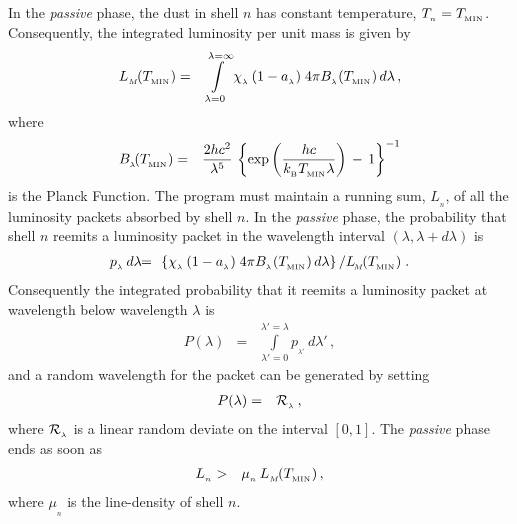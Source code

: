 \documentclass[usenatbib]{mn2e}
\numberwithin{equation}{section}
\begin{document}
In the {\it passive} phase, the dust in shell $n$ has constant temperature, $T_{_n}=T_{_{\rm MIN}}$. Consequently, the integrated luminosity per unit mass is given by
\begin{eqnarray}
L_{_M}\!(T_{_{\rm MIN}})&=&\int\limits_{\lambda=0}^{\lambda=\infty} \chi_{_\lambda}\,(1-a_{_\lambda})\;4\pi B_{_\lambda}(T_{_{\rm MIN}})\,d\lambda\,,
\end{eqnarray}
where
\begin{eqnarray}
B_{_\lambda}\!(T_{_{\rm MIN}})&=&\frac{2hc^2}{\lambda^5}\,\left\{\exp\left(\frac{hc}{k_{_{\rm B}}T_{_{\rm MIN}}\lambda}\right)\,-\,1\right\}^{-1}
\end{eqnarray}
is the Planck Function. The program must maintain a running sum, $L_{_n}$, of all the luminosity packets absorbed by shell $n$. In the {\it passive} phase, the probability that shell $n$ reemits a luminosity packet in the wavelength interval $(\lambda,\lambda+d\lambda)$ is
\begin{eqnarray}
p_{_\lambda}\,d\lambda\!&\!=\!&\!\left\{\chi_{_\lambda}\,(1-a_{_\lambda})\;4\pi B_{_\lambda}(T_{_{\rm MIN}})\,d\lambda\right\}\left/L_{_{\!M}}\!(T_{_{\rm MIN}})\right..
\end{eqnarray}
Consequently the integrated probability that it reemits a luminosity packet at wavelength below wavelength $\lambda$ is
\begin{eqnarray}
P(\lambda)&=&\int\limits_{\lambda'=0}^{\lambda'=\lambda}p_{_{\lambda'}}\,d\lambda'\,,
\end{eqnarray}
and a random wavelength for the packet can be generated by setting 
\begin{eqnarray}
P(\lambda)&=&{\cal R}_{_\lambda}\,,
\end{eqnarray}
where ${\cal R}_{_\lambda}$ is a linear random deviate on the interval $[0,1]$. The {\it passive} phase ends as soon as 
\begin{eqnarray}
L_{_n}&>&\mu_{_n}\,L_{_M}\!(T_{_{\rm MIN}})\,,
\end{eqnarray}
where $\mu_{_n}$ is the line-density of shell $n$.
\end{document}
